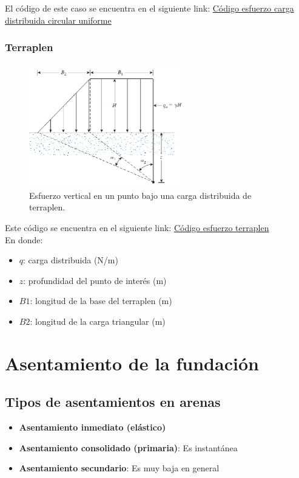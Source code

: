\documentclass{article} %
\begin{document}
El código de este caso se encuentra en el siguiente link: \href{https://github.com/berckanala/Fundaciones_P2/blob/main/Codigos/python/esfuerzo_circular.py}{Código esfuerzo carga distribuida circular uniforme}\\

\subsubsection*{Terraplen}

\begin{figure}[h]
    \centering
    \includegraphics[width=0.6\textwidth]{Graficos/Carga_terraplen.PNG}
    \caption{Esfuerzo vertical en un punto bajo una carga distribuida de terraplen.}
    \label{fig:terraplen}    
\end{figure}

Este código se encuentra en el siguiente link: \href{https://github.com/berckanala/Fundaciones_P2/blob/main/Codigos/python/esfuerzo_terraplen.py}{Código esfuerzo terraplen}\\
En donde:
\begin{itemize}
    \item $q$: carga distribuida (N/m)
    \item $z$: profundidad del punto de interés (m)
    \item $B1$: longitud de la base del terraplen (m)
    \item $B2$: longitud de la carga triangular (m)
\end{itemize}

\section{Asentamiento de la fundación}


\subsection*{Tipos de asentamientos en arenas}
\begin{itemize}
    \item \textbf{Asentamiento inmediato (elástico)}
    \item \textbf{Asentamiento consolidado (primaria)}: Es instantánea
    \item \textbf{Asentamiento secundario}: Es muy baja en general
\end{itemize}
\end{document}
